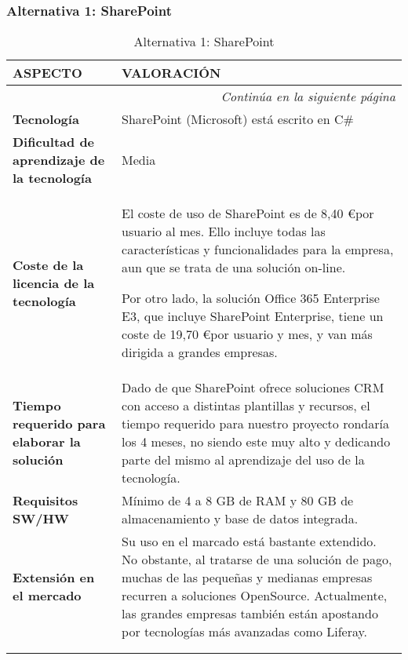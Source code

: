 \subsubsection{Alternativa 1: SharePoint}

\begin{center}
\begin{longtable}{p{4cm} p{8cm}}

\textbf{ASPECTO} & \textbf{VALORACIÓN} \\ \hline \hline
\endfirsthead
\endhead

\multicolumn{2}{r}{\textit{Continúa en la siguiente página}} \\
\endfoot
\endlastfoot

\textbf{Tecnología} & SharePoint (Microsoft) está escrito en C\#\\ \hline

\textbf{Dificultad de aprendizaje de la tecnología} & Media\\ \hline

\textbf{Coste de la licencia de la tecnología} &
\par El coste de uso de SharePoint es de 8,40 \euro por usuario al mes. Ello incluye todas las características y funcionalidades para la empresa, aun que se trata de una solución on-line.
\par Por otro lado, la solución Office 365 Enterprise E3, que incluye SharePoint Enterprise, tiene un coste de 19,70 \euro por usuario y mes, y van más dirigida a grandes empresas.
\\ \hline

\textbf{Tiempo requerido para elaborar la solución} & Dado de que SharePoint ofrece soluciones CRM con acceso a distintas plantillas y recursos, el tiempo requerido para nuestro proyecto rondaría los 4 meses, no siendo este muy alto y dedicando parte del mismo al aprendizaje del uso de la tecnología.\\ \hline

\textbf{Requisitos SW/HW} & Mínimo de 4 a 8 GB de RAM y 80 GB de almacenamiento y base de datos integrada.\\ \hline

\textbf{Extensión en el mercado} & Su uso en el marcado está bastante extendido. No obstante, al tratarse de una solución de pago, muchas de las pequeñas y medianas empresas recurren a soluciones OpenSource. Actualmente, las grandes empresas también están apostando por tecnologías más avanzadas como Liferay.\\ \hline \hline


\caption{Alternativa 1: SharePoint}\\
\label{tab:alternative1}
\end{longtable}
\end{center}
